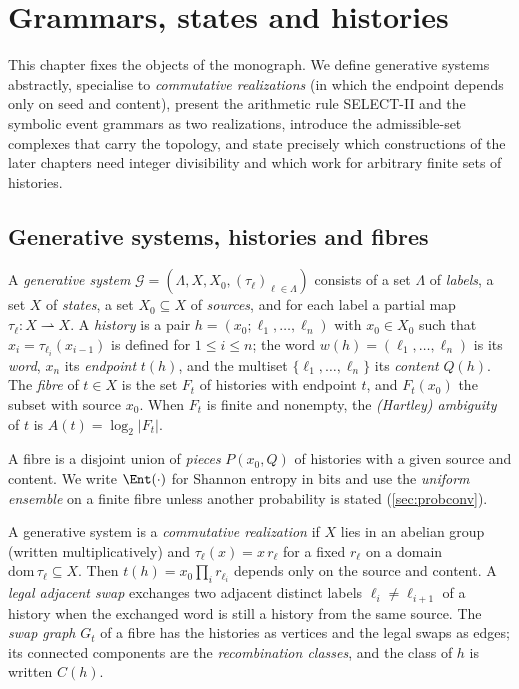 \chapter{Grammars, states and histories}\label{ch:grammars}

This chapter fixes the objects of the monograph. We define generative systems abstractly, specialise to \emph{commutative realizations} (in which the endpoint depends only on seed and content), present the arithmetic rule SELECT-II and the symbolic event grammars as two realizations, introduce the admissible-set complexes that carry the topology, and state precisely which constructions of the later chapters need integer divisibility and which work for arbitrary finite sets of histories.

\section{Generative systems, histories and fibres}
\begin{definition}\label{def:grammar}
A \emph{generative system} $\mathcal G=(\Lambda,X,X_0,(\tau_\ell)_{\ell\in\Lambda})$ consists of a set $\Lambda$ of \emph{labels}, a set $X$ of \emph{states}, a set $X_0\subseteq X$ of \emph{sources}, and for each label a partial map $\tau_\ell\colon X\rightharpoonup X$. A \emph{history} is a pair $h=(x_0;\ell_1,\dots,\ell_n)$ with $x_0\in X_0$ such that $x_i=\tau_{\ell_i}(x_{i-1})$ is defined for $1\le i\le n$; the word $w(h)=(\ell_1,\dots,\ell_n)$ is its \emph{word}, $x_n$ its \emph{endpoint} $t(h)$, and the multiset $\{\ell_1,\dots,\ell_n\}$ its \emph{content} $Q(h)$. The \emph{fibre} of $t\in X$ is the set $F_t$ of histories with endpoint $t$, and $F_t(x_0)$ the subset with source $x_0$. When $F_t$ is finite and nonempty, the \emph{(Hartley) ambiguity} of $t$ is $A(t)=\log_2|F_t|$.
\end{definition}

A fibre is a disjoint union of \emph{pieces} $P(x_0,Q)$ of histories with a given source and content. We write $\Ent(\cdot)$ for Shannon entropy in bits and use the \emph{uniform ensemble} on a finite fibre unless another probability is stated (\cref{sec:probconv}).

\begin{definition}\label{def:swap}
A generative system is a \emph{commutative realization} if $X$ lies in an abelian group (written multiplicatively) and $\tau_\ell(x)=x\,r_\ell$ for a fixed $r_\ell$ on a domain $\mathrm{dom}\,\tau_\ell\subseteq X$. Then $t(h)=x_0\prod_i r_{\ell_i}$ depends only on the source and content. A \emph{legal adjacent swap} exchanges two adjacent distinct labels $\ell_i\ne\ell_{i+1}$ of a history when the exchanged word is still a history from the same source. The \emph{swap graph} $G_t$ of a fibre has the histories as vertices and the legal swaps as edges; its connected components are the \emph{recombination classes}, and the class of $h$ is written $C(h)$.
\end{definition}

